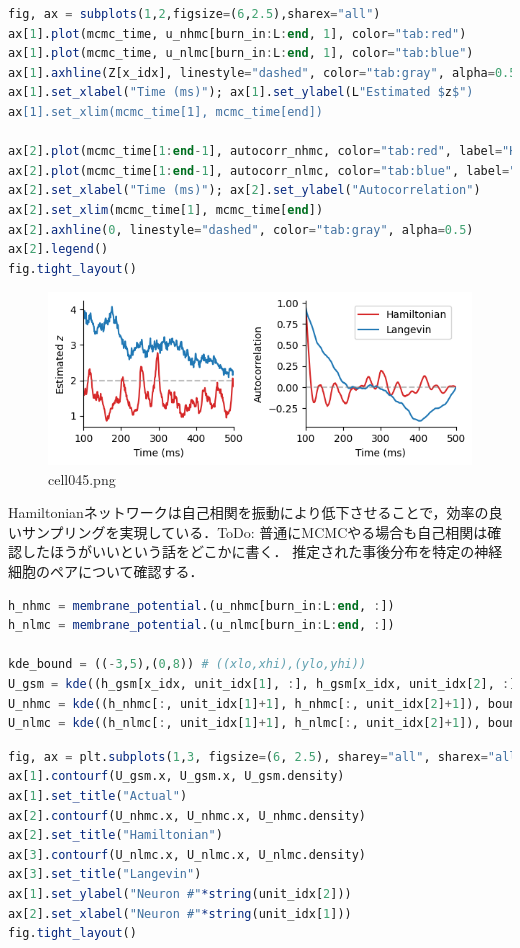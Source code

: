 \begin{lstlisting}[language=julia]
fig, ax = subplots(1,2,figsize=(6,2.5),sharex="all")
ax[1].plot(mcmc_time, u_nhmc[burn_in:L:end, 1], color="tab:red")
ax[1].plot(mcmc_time, u_nlmc[burn_in:L:end, 1], color="tab:blue")
ax[1].axhline(Z[x_idx], linestyle="dashed", color="tab:gray", alpha=0.5)
ax[1].set_xlabel("Time (ms)"); ax[1].set_ylabel(L"Estimated $z$")
ax[1].set_xlim(mcmc_time[1], mcmc_time[end])

ax[2].plot(mcmc_time[1:end-1], autocorr_nhmc, color="tab:red", label="Hamiltonian")
ax[2].plot(mcmc_time[1:end-1], autocorr_nlmc, color="tab:blue", label="Langevin")
ax[2].set_xlabel("Time (ms)"); ax[2].set_ylabel("Autocorrelation")
ax[2].set_xlim(mcmc_time[1], mcmc_time[end])
ax[2].axhline(0, linestyle="dashed", color="tab:gray", alpha=0.5)
ax[2].legend()
fig.tight_layout()
\end{lstlisting}
\begin{figure}[ht]
	\centering
	\includegraphics[scale=0.8, max width=\linewidth]{./fig/bayesian-brain/neural-sampling/cell045.png}
	\caption{cell045.png}
	\label{cell045.png}
\end{figure}
Hamiltonianネットワークは自己相関を振動により低下させることで，効率の良いサンプリングを実現している．ToDo: 普通にMCMCやる場合も自己相関は確認したほうがいいという話をどこかに書く．
推定された事後分布を特定の神経細胞のペアについて確認する．
\begin{lstlisting}[language=julia]
h_nhmc = membrane_potential.(u_nhmc[burn_in:L:end, :])
h_nlmc = membrane_potential.(u_nlmc[burn_in:L:end, :])

kde_bound = ((-3,5),(0,8)) # ((xlo,xhi),(ylo,yhi))
U_gsm = kde((h_gsm[x_idx, unit_idx[1], :], h_gsm[x_idx, unit_idx[2], :]), boundary=kde_bound)
U_nhmc = kde((h_nhmc[:, unit_idx[1]+1], h_nhmc[:, unit_idx[2]+1]), boundary=kde_bound)
U_nlmc = kde((h_nlmc[:, unit_idx[1]+1], h_nlmc[:, unit_idx[2]+1]), boundary=kde_bound);
\end{lstlisting}
\begin{lstlisting}[language=julia]
fig, ax = plt.subplots(1,3, figsize=(6, 2.5), sharey="all", sharex="all")
ax[1].contourf(U_gsm.x, U_gsm.x, U_gsm.density)
ax[1].set_title("Actual")
ax[2].contourf(U_nhmc.x, U_nhmc.x, U_nhmc.density)
ax[2].set_title("Hamiltonian")
ax[3].contourf(U_nlmc.x, U_nlmc.x, U_nlmc.density)
ax[3].set_title("Langevin")
ax[1].set_ylabel("Neuron #"*string(unit_idx[2]))
ax[2].set_xlabel("Neuron #"*string(unit_idx[1])) 
fig.tight_layout()
\end{lstlisting}
